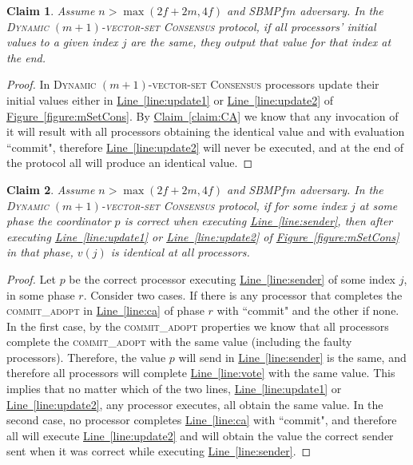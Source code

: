 \documentclass[11pt]{article}
\newtheorem{claim}{Claim}
\newcommand{\namedref}[2]{\hyperref[#2]{#1~\ref*{#2}}}
\newcommand{\figureref}[1]{\namedref{Figure}{#1}}
\newcommand{\claimref}[1]{\namedref{Claim}{#1}}
\newcommand{\lref}[1]{\namedref{Line}{#1}}
\newcommand{\SBMPfm}{\mbox{SBMP\!$f\!m$}\xspace}
\newcommand{\mSetCons}{\textsc{Dynamic $(m+1)$-vector-set Consensus}\xspace}
\newcommand{\ca}{{\small\textsc{commit\!\_adopt}}\xspace}
\begin{document}
\begin{claim}\label{claim:samev}
Assume $n>\max(2f+2m,4f)$ and \SBMPfm adversary.  In the \mSetCons protocol, if all processors' initial values to a given index $j$ are the same, they output that value for that index at the end.
\end{claim}
\begin{proof}
In \mSetCons processors update their initial values either in \lref{line:update1} or \lref{line:update2} of \figureref{figure:mSetCons}.  By \claimref{claim:CA} we know that any invocation of it will result with all processors obtaining the identical value and with evaluation ``commit", therefore \lref{line:update2} will never be executed, and at the end of the protocol all will produce an identical value.
\end{proof}



\begin{claim}\label{claim:correct-coordinator}
Assume $n>\max(2f+2m,4f)$ and \SBMPfm adversary.  In the \mSetCons protocol, if  for some index $j$ at some phase the coordinator $p$ is correct when executing \lref{line:sender}, then after executing \lref{line:update1} or \lref{line:update2} of \figureref{figure:mSetCons} in that phase, $v(j)$ is identical at all processors. 
\end{claim}
\begin{proof}
Let $p$ be the correct processor executing \lref{line:sender} of some index $j$, in some phase $r$. Consider two cases.  If there is any processor that completes  the \ca in \lref{line:ca} of phase $r$ with ``commit" and the other if none.  In the first case, by the \ca properties we know that all processors complete the \ca with the same value (including the faulty processors).  Therefore, the value $p$ will send in \lref{line:sender} is the same, and therefore all processors will complete \lref{line:vote} with the same value. This implies that no matter which of the two lines, \lref{line:update1} or \lref{line:update2}, any processor executes, all obtain the same value.
In the second case, no processor completes \lref{line:ca} with ``commit", and therefore all will execute \lref{line:update2} and will obtain the value the correct sender sent when it was correct while executing  \lref{line:sender}.
\end{proof}
\end{document}
